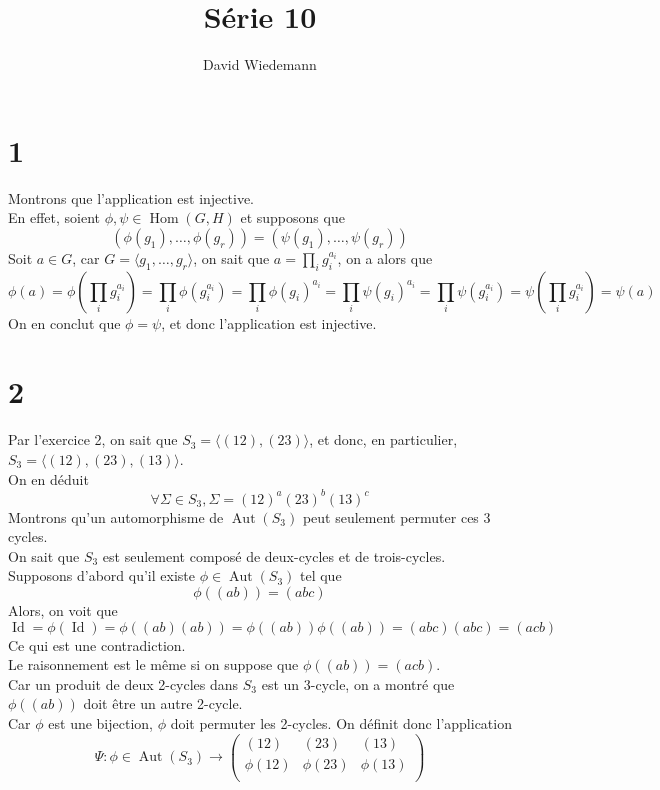 \documentclass[11pt, a4paper, twoside]{article}
\DeclareMathOperator*{\om}{Hom}
\DeclareMathOperator*{\aut}{Aut}
\DeclareMathOperator*{\id}{Id}
\begin{document}
\title{Série 10}
\author{David Wiedemann}
\maketitle
\section*{1}
Montrons que l'application est injective.\\
En effet, soient $\phi, \psi \in \om(G,H ) $ et supposons que
\[ 
	( \phi( g_1) , \ldots, \phi( g_r) ) = ( \psi( g_1) , \ldots, \psi( g_r) )
\]
Soit $a \in G$, car $G= \langle g_1, \ldots, g_r \rangle$, on sait que $a= \prod_i g_i^{a_i}$, on a alors que
\[ 
	\phi( a) = \phi\left( \prod_i g_i ^{a_i}\right) = \prod_i \phi( g_i ^{a_i} )  = \prod_i \phi( g_i) ^{a_i} = \prod_i \psi( g_i) ^{a_i}= \prod_i \psi\left( g_i^{a_i}\right) = \psi\left( \prod_i g_i ^{a_i}\right) = \psi( a) 
\]
On en conclut que $\phi= \psi$, et donc l'application est injective.
\section*{2}
Par l'exercice 2, on sait que $S_3 = \langle ( 12) , ( 23) \rangle$, et donc, en particulier, $S_3 = \langle ( 12) , ( 23), ( 13)\rangle $.\\
On en déduit
\[ 
	\forall \Sigma \in S_3, \Sigma = ( 12) ^{a} ( 23) ^{b} ( 13) ^{c}
\]
Montrons qu'un automorphisme de $\aut( S_3) $ peut seulement permuter ces 3 cycles.\\
On sait que $S_3$ est seulement composé de deux-cycles et de trois-cycles.\\
Supposons d'abord qu'il existe $\phi \in \aut( S_3) $ tel que
\[ 
	\phi( ( ab) ) = ( abc) 
\]
Alors, on voit que
\[ 
	\id = \phi( \id) = \phi( ( ab) ( ab) ) = \phi( ( ab) ) \phi( ( ab )) = ( abc) ( abc) = ( acb) 
\]
Ce qui est une contradiction.\\
Le raisonnement est le même si on suppose que $\phi( ( ab) ) = ( acb) $.\\
Car un produit de deux 2-cycles dans $S_3$ est un 3-cycle, on a montré que $\phi( ( ab )) $ doit être un autre 2-cycle.\\
Car $\phi$ est une bijection, $\phi$ doit permuter les 2-cycles.
On définit donc l'application
\[ 
	\Psi: \phi\in \aut( S_3) \to 
	\begin{pmatrix}
		( 12) & ( 23) & ( 13) \\
		\phi( 12) & \phi( 23) & \phi( 13) \\
	\end{pmatrix}
\]
\end{document}
